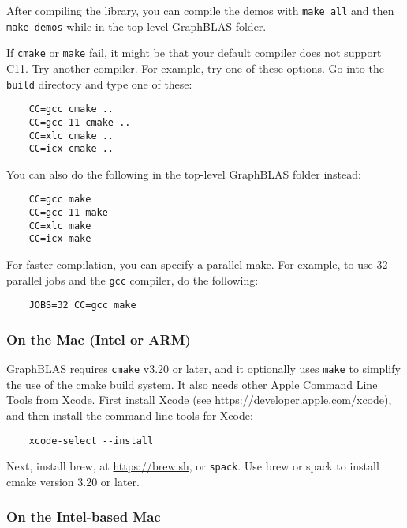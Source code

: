 \documentclass[12pt]{article}
\begin{document}
After compiling the library, you can compile the demos with
\verb'make all' and then \verb'make demos' while in the top-level
GraphBLAS folder.

If \verb'cmake' or \verb'make' fail, it might be that your default compiler
does not support C11.  Try another compiler.  For example, try one of
these options.  Go into the \verb'build' directory and type one of these:

    {\small
    \begin{verbatim}
    CC=gcc cmake ..
    CC=gcc-11 cmake ..
    CC=xlc cmake ..
    CC=icx cmake ..  \end{verbatim} }

You can also do the following in the top-level GraphBLAS folder instead:

    {\small
    \begin{verbatim}
    CC=gcc make
    CC=gcc-11 make
    CC=xlc make
    CC=icx make \end{verbatim} }

For faster compilation, you can specify a parallel make.  For example,
to use 32 parallel jobs and the \verb'gcc' compiler, do the following:

    {\small
    \begin{verbatim}
    JOBS=32 CC=gcc make \end{verbatim} }

\subsubsection{On the Mac (Intel or ARM)}

GraphBLAS requires \verb'cmake' v3.20 or later, and it optionally uses
\verb'make' to simplify the use of the cmake build system.  It also needs
other Apple Command Line Tools from Xcode.
First install Xcode (see \url{https://developer.apple.com/xcode}),
and then install the command line tools for Xcode:

    {\small
    \begin{verbatim}
    xcode-select --install \end{verbatim} }

Next, install brew, at \url{https://brew.sh}, or \verb'spack'.
Use brew or spack to install cmake version 3.20 or later.

\subsubsection{On the Intel-based Mac}
\end{document}

